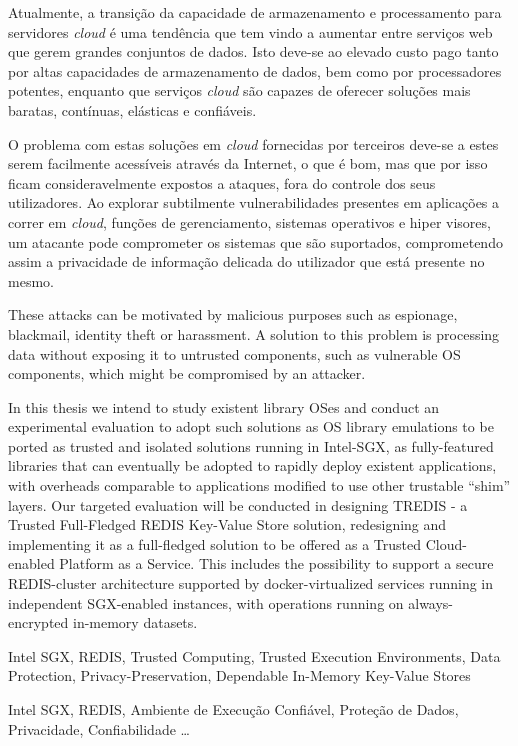 Atualmente, a transição da capacidade de armazenamento e processamento para servidores \textit{cloud} é uma tendência que tem vindo a aumentar entre serviços web que gerem grandes conjuntos de dados. 
Isto deve-se ao elevado custo pago tanto por altas capacidades de armazenamento de dados, bem como por processadores potentes, enquanto que serviços \textit{cloud} são capazes de oferecer soluções mais baratas, contínuas, elásticas e confiáveis. 

O problema com estas soluções em \textit{cloud} fornecidas por terceiros deve-se a estes serem facilmente acessíveis através da Internet, o que é bom, mas que por isso ficam consideravelmente expostos a ataques, fora do controle dos seus utilizadores. Ao explorar subtilmente vulnerabilidades presentes em aplicações a correr em \textit{cloud}, funções de gerenciamento, sistemas operativos e hiper visores, um atacante pode comprometer os sistemas que são suportados, comprometendo assim a privacidade de informação delicada do utilizador que está presente no mesmo.

These attacks can be motivated by malicious purposes such as espionage, blackmail, identity theft or harassment. A solution to this problem is processing data without exposing it to untrusted components, such as vulnerable OS components, which might be compromised by an attacker.

In this thesis we intend to study existent library OSes and conduct an experimental evaluation to adopt such solutions as OS library emulations to be ported as trusted and isolated solutions running in Intel-SGX, as fully-featured libraries that can eventually be adopted to rapidly deploy existent applications, with overheads comparable to applications modified to use other trustable “shim” layers. Our targeted evaluation will be conducted in designing TREDIS - a Trusted Full-Fledged REDIS Key-Value Store solution, redesigning and implementing it as a full-fledged solution to be offered as a Trusted Cloud-enabled Platform as a Service. This includes the possibility to support a secure REDIS-cluster architecture supported by docker-virtualized services running in independent SGX-enabled instances, with operations running on always-encrypted in-memory datasets. 


\begin{keywords}
	Intel SGX, REDIS, Trusted Computing, Trusted Execution Environments, Data Protection, Privacy-Preservation, Dependable In-Memory Key-Value Stores
\end{keywords} 

	
\begin{keywords}
Intel SGX, REDIS, Ambiente de Execução Confiável, Proteção de Dados, Privacidade, Confiabilidade \ldots
\end{keywords}


	
